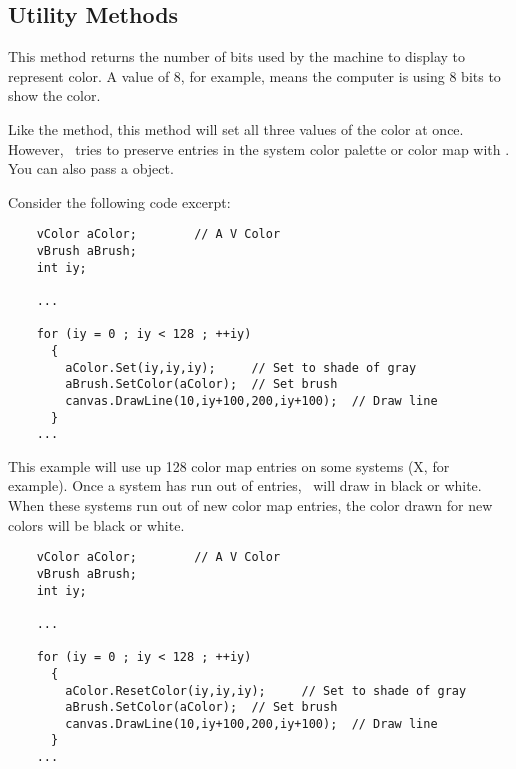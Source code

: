 \subsection* {Utility Methods} %


This method returns the number of bits used by the machine
to display to represent color. A value of 8, for example,
means the computer is using 8 bits to show the color.


Like the  method, this method will set all three values
of the color at once. However, \V\ tries to preserve entries in
the system color palette or color map with .
You can also pass a  object.

Consider the following code excerpt:

\footnotesize
\begin{verbatim}
    vColor aColor;        // A V Color
    vBrush aBrush;
    int iy;

    ...

    for (iy = 0 ; iy < 128 ; ++iy)
      {
        aColor.Set(iy,iy,iy);     // Set to shade of gray
        aBrush.SetColor(aColor);  // Set brush
        canvas.DrawLine(10,iy+100,200,iy+100);  // Draw line
      }
    ...

\end{verbatim}
\normalfont\normalsize

This example will use up 128 color map entries on some systems
(X, for example). Once a system has run out of entries, \V\ will
draw in black or white. When these systems run out of new color
map entries, the color drawn for new colors will be black or
white. 

\footnotesize
\begin{verbatim}
    vColor aColor;        // A V Color
    vBrush aBrush;
    int iy;

    ...

    for (iy = 0 ; iy < 128 ; ++iy)
      {
        aColor.ResetColor(iy,iy,iy);     // Set to shade of gray
        aBrush.SetColor(aColor);  // Set brush
        canvas.DrawLine(10,iy+100,200,iy+100);  // Draw line
      }
    ...

\end{verbatim}
\normalfont\normalsize

